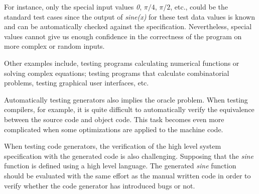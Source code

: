 For instance, only the special input values  \textit{0}, $\pi/4$,  $\pi/2$, etc., could be the standard test cases since the output of  \textit{sine(x)} for these test data values is known and can be automatically checked against the specification. Nevertheless, special values cannot give us enough confidence in the correctness of the program on more complex or random inputs. 

Other examples include, testing programs calculating numerical functions or solving complex equations; testing programs that calculate combinatorial problems, testing graphical user interfaces, etc.

Automatically testing generators also implies the oracle problem. When testing compilers, for example, it is quite difficult to automatically verify the equivalence between the source code and object code. This task becomes even more complicated when some optimizations are applied to the machine code. 

When testing code generators, the verification of the high level system specification with the generated code is also challenging. Supposing that the \textit{sine} function is defined using a high level language. The generated \textit{sine} function should be evaluated with the same effort as the manual written code in order to verify whether the code generator has introduced bugs or not. 




